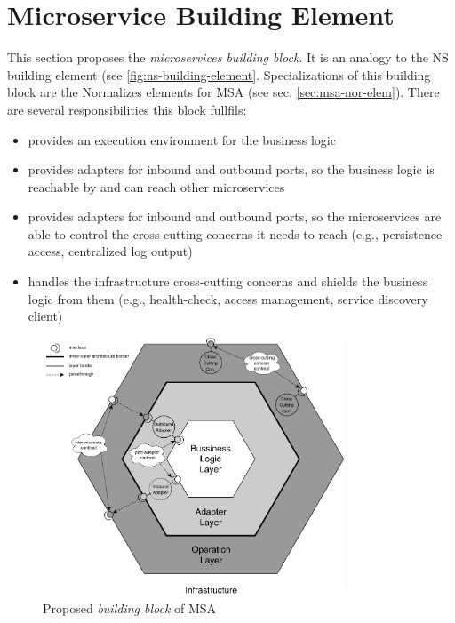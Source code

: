 \documentclass[thesis=M,english,hidelinks]{FITthesis}[2012/10/20]
\begin{document}
\section{Microservice Building Element}
This section proposes the \textit{microservices building block}. It is an analogy to the \acrshort{NS} building element (see \ref{fig:ns-building-element}. Specializations of this building block are the Normalizes elements for \acrshort{MSA} (see sec. \ref{sec:msa-nor-elem}). There are several responsibilities this block fullfils:
\begin{itemize}
    \item provides an execution environment for the business logic
    \item provides adapters for inbound and outbound ports, so the business logic is reachable by and can reach other microservices 
    \item provides adapters for inbound and outbound ports, so the microservices are able to control the cross-cutting concerns it needs to reach (e.g., persistence access, centralized log output)
    \item handles the infrastructure cross-cutting concerns and shields the business logic from them (e.g., health-check, access management, service discovery client)
\end{itemize}


\begin{figure}
  \centering
    \includegraphics[width=0.8\textwidth]{images/proposed-ms-architecture.pdf}
    \caption{Proposed \textit{building block} of \acrshort{MSA}}
    \label{fig:proposed-building-block}
\end{figure}
\end{document}
